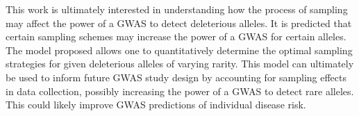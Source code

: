This work is ultimately interested in understanding how the process of sampling may affect the power of a GWAS to detect deleterious alleles. It is predicted that certain sampling schemes may increase the power of a GWAS for certain alleles. The model proposed allows one to quantitatively determine the optimal sampling strategies for given deleterious alleles of varying rarity. This model can ultimately be used to inform future GWAS study design by accounting for sampling effects in data collection, possibly increasing the power of a GWAS to detect rare alleles. This could likely improve GWAS predictions of individual disease risk.